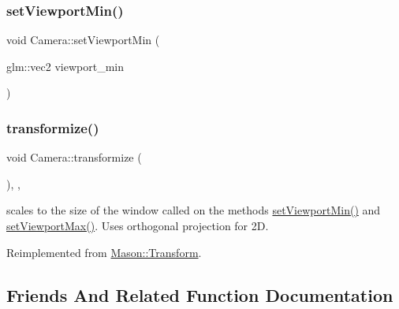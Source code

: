 \hypertarget{class_mason_1_1_camera_aa630259d7e0c0124dec5c9aaf33b7160}{}\label{class_mason_1_1_camera_aa630259d7e0c0124dec5c9aaf33b7160} 
\subsubsection{\texorpdfstring{set\+Viewport\+Min()}{setViewportMin()}}
{\footnotesize\ttfamily void Camera\+::set\+Viewport\+Min (\begin{DoxyParamCaption}\item[{glm\+::vec2}]{viewport\+\_\+min }\end{DoxyParamCaption})}

\hypertarget{class_mason_1_1_camera_a27ff2d3ad004a49db2ae508ac6e9d3c2}{}\label{class_mason_1_1_camera_a27ff2d3ad004a49db2ae508ac6e9d3c2} 
\subsubsection{\texorpdfstring{transformize()}{transformize()}}
{\footnotesize\ttfamily void Camera\+::transformize (\begin{DoxyParamCaption}{ }\end{DoxyParamCaption})\hspace{0.3cm}{\ttfamily [override]}, {\ttfamily [protected]}, {\ttfamily [virtual]}}



scales to the size of the window called on the methods \hyperlink{class_mason_1_1_camera_aa630259d7e0c0124dec5c9aaf33b7160}{set\+Viewport\+Min()} and \hyperlink{class_mason_1_1_camera_a1f9a7896bb617d1402e3c4738324e1ea}{set\+Viewport\+Max()}. Uses orthogonal projection for 2D. 



Reimplemented from \hyperlink{class_mason_1_1_transform_a4dd61568d49044377f3312397ffdafd1}{Mason\+::\+Transform}.



\subsection{Friends And Related Function Documentation}
\hypertarget{class_mason_1_1_camera_a3e1914489e4bed4f9f23cdeab34a43dc}{}\label{class_mason_1_1_camera_a3e1914489e4bed4f9f23cdeab34a43dc} 
